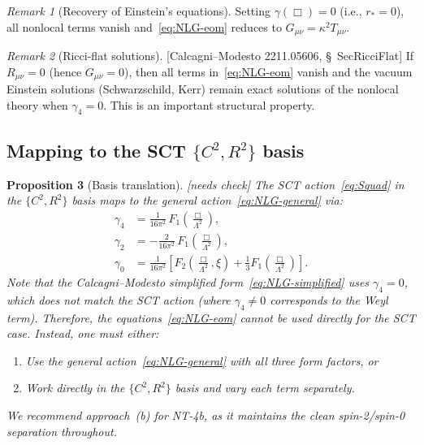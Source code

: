 \documentclass[12pt,a4paper]{article}
\newtheorem{proposition}{Proposition}[section]
\theoremstyle{definition}
\theoremstyle{remark}
\newtheorem{remark}[proposition]{Remark}
\newcommand{\fromlit}[1]{\textcolor{blue!70!black}{\textsf{[#1]}}}
\newcommand{\needscheck}{\textcolor{orange!80!black}{\textsf{[needs check]}}}
\begin{document}
\begin{remark}[Recovery of Einstein's equations]
Setting $\gamma(\Box) = 0$ (i.e., $r_* = 0$), all nonlocal terms
vanish and~\eqref{eq:NLG-eom} reduces to $G_{\mu\nu} = \kappa^2 T_{\mu\nu}$.
\end{remark}

\begin{remark}[Ricci-flat solutions]
\fromlit{Calcagni--Modesto 2211.05606, \S~SecRicciFlat}
If $R_{\mu\nu} = 0$ (hence $G_{\mu\nu} = 0$), then all terms
in~\eqref{eq:NLG-eom} vanish and the vacuum Einstein solutions
(Schwarzschild, Kerr) remain exact solutions of the nonlocal theory
when $\gamma_4 = 0$.  This is an important structural property.
\end{remark}


\subsection{Mapping to the SCT $\{C^2, R^2\}$ basis}

\begin{proposition}[Basis translation]
\label{prop:basis-translation}
\needscheck\;
The SCT action~\eqref{eq:Squad} in the $\{C^2, R^2\}$ basis maps
to the general action~\eqref{eq:NLG-general} via:
\begin{align}
  \gamma_4 &= \frac{1}{16\pi^2}\,F_1\!\left(\frac{\Box}{\Lambda^2}\right),
  \label{eq:gamma4}\\
  \gamma_2 &= -\frac{2}{16\pi^2}\,F_1\!\left(\frac{\Box}{\Lambda^2}\right),
  \label{eq:gamma2}\\
  \gamma_0 &= \frac{1}{16\pi^2}\left[
    F_2\!\left(\frac{\Box}{\Lambda^2},\xi\right)
    + \frac{1}{3}F_1\!\left(\frac{\Box}{\Lambda^2}\right)
  \right].
  \label{eq:gamma0}
\end{align}
Note that the Calcagni--Modesto simplified form~\eqref{eq:NLG-simplified}
uses $\gamma_4 = 0$, which does \emph{not} match the SCT action (where
$\gamma_4 \neq 0$ corresponds to the Weyl term).  Therefore, the
equations~\eqref{eq:NLG-eom} cannot be used directly for the SCT case.
Instead, one must either:
\begin{enumerate}[nosep,label=(\alph*)]
  \item Use the general action~\eqref{eq:NLG-general} with all three
    form factors, or
  \item Work directly in the $\{C^2, R^2\}$ basis and vary each term
    separately.
\end{enumerate}
We recommend approach~(b) for NT-4b, as it maintains the clean
spin-2/spin-0 separation throughout.
\end{proposition}
\end{document}
